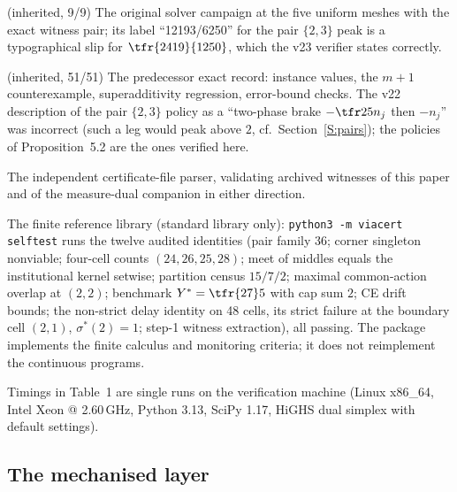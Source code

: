 \begin{description}[leftmargin=1.5em,itemsep=2pt]
\item[\texttt{paper2c\_lp\_campaign.py}] (inherited, 9/9) The original solver campaign at the five uniform meshes with the exact witness pair; its label ``12193/6250'' for the pair $\{2,3\}$ peak is a typographical slip for $\tfr{2419}{1250}$, which the v23 verifier states correctly.
\item[\texttt{paper2\_nonstandard\_verification.py}] (inherited, 51/51) The predecessor exact record: instance values, the $m+1$ counterexample, superadditivity regression, error-bound checks. The v22 description of the pair $\{2,3\}$ policy as a ``two-phase brake $-\tfr25n_j$ then $-n_j$'' was incorrect (such a leg would peak above $2$, cf.\ Section~\ref{S:pairs}); the policies of Proposition~5.2 are the ones verified here.
\item[\texttt{certificate\_exchange\_v1.py}] The independent certificate-file parser, validating archived witnesses of this paper and of the measure-dual companion in either direction.
\item[\texttt{viacert/}] The finite reference library (standard library only): \texttt{python3 -m viacert selftest} runs the twelve audited identities (pair family 36; corner singleton nonviable; four-cell counts $(24,26,25,28)$; meet of middles equals the institutional kernel setwise; partition census $15/7/2$; maximal common-action overlap at $(2,2)$; benchmark $Y^\ast=\tfr{27}5$ with cap sum $2$; CE drift bounds; the non-strict delay identity on 48 cells, its strict failure at the boundary cell $(2,1)$, $\sigma^\ast(2)=1$; step-1 witness extraction), all passing. The package implements the finite calculus and monitoring criteria; it does not reimplement the continuous programs.
\end{description}

Timings in Table~1 are single runs on the verification machine (Linux x86\_64, Intel Xeon @ 2.60\,GHz, Python 3.13, SciPy 1.17, HiGHS dual simplex with default settings).

\subsection{The mechanised layer}

